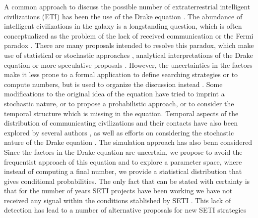 \documentclass[crop]{CSLB}%
\begin{document}
A common approach to discuss the possible number of extraterrestrial
intelligent civilizations (ETI) has been the use of the Drake equation
\citep{gleiser_drake_2010, prantzos_joint_2013, haqq-misra_drake_2017}.
%
The abundance of intelligent civilizations in the galaxy is a
longstanding question, which is often conceptualized as the problem of
the lack of received communication or the Fermi paradox
\citep{barlow_galactic_2012, Sotos_biotechnology_2019, 
forgan_galactic_2016}.
There are many proposals intended to resolve this paradox, which make
use of statistical \citep{solomonides_probabilistic_2016,
vanhouten_isthere_2017, horvat_calculating_2007, maccone_statistical_2015} or
stochastic approaches \citep{forgan_numerical_2009,
bloetscher_using_2019, glade_stochastic_2011, forgan_numerical_2010},
analytical interpretations of the Drake equation \citep{prantzos_joint_2013, smith_broadcasting_2009}
or more speculative proposals
\citep{barlow_galactic_2013, lampton_information_2013, conway_three_2018, forgan_galactic_2017}.
%
However, the uncertainties in the factors make it less prone to a
formal application to define searching strategies or to compute
numbers, but is used to organize the discussion instead
\citep{hinkel_interdisciplinary_2019}.
%
Some modifications to the original idea of the equation have tried to
imprint a stochastic nature, or to propose a probabilistic approach,
or to consider the temporal structure which is missing in the
equation.
%
Temporal aspects of the distribution of communicating civilizations
and their contacts have also been explored by several authors
\citep{fogg_temporal_1987, forgan_spatiotemporal_2011,
balbi_impact_2018, balb_spatiotemporal_2018, horvat_impact_2011},
%
as well as efforts on considering the stochastic nature of the Drake equation
\citep{glade_stochastic_2011}.
%
The simulation approach has also benn considered
\citep{forgan_evaluating_2015, vukotic_grandeur_2016,
murante_simulating_2015, forgan_numerical_2009, forgan_galactic_2017}
%
Since the factors in the Drake equation are uncertain, we propose to
avoid the frequentist approach of this equation and to explore a
parameter space, where instead of computing a final number, we provide
a statistical distribution that gives conditional probabilities.
%
The only fact that can be stated with certainty is that for the number
of years SETI projects have been working we have not received any
signal within the conditions stablished by SETI \citep{tarter_search_2001}.
%
This lack of detection has lead to a number of alternative proposals
for new SETI strategies \citep{forgan_exoplanet_2017,
balbi_impact_2018, loeb_eavesdropping_2006, maccone_KLT_2010,
tarter_advancing_2009, enriquez_breakthrough_2017, loeb_relative_2016,
maccone_SETI_2011,  lingam_relative_2019, wright_theGsearch_2015,
maccone_SETI_2013, maccone_lognormals_2014, harp_application_2018,
forgan_possibility_2013, forgan_galactic_2017, funes_searching_2019}
 
\end{document}
